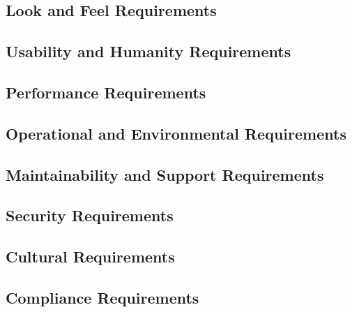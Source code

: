 \documentclass[12pt]{article}
\begin{document}
\subsection{Look and Feel Requirements}
\subsection{Usability and Humanity Requirements}
\subsection{Performance Requirements}
\subsection{Operational and Environmental Requirements}
\subsection{Maintainability and Support Requirements}
\subsection{Security Requirements}
\subsection{Cultural Requirements}
\subsection{Compliance Requirements}
\end{document}
